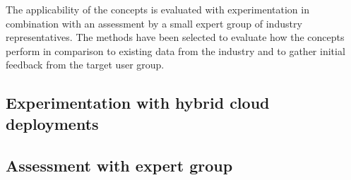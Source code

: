 \documentclass[../main.tex]{subfiles}
\begin{document}
    The applicability of the concepts is evaluated with experimentation in combination with an assessment by a small expert group of industry representatives.
    The methods have been selected to evaluate how the concepts perform in comparison to existing data from the industry and to gather initial feedback from the target user group.

    \subsection{Experimentation with hybrid cloud deployments}
    \label{subsec:meth-sim-depl}

    

    \subsection{Assessment with expert group}
    \label{subsec:meth-assessment}

    
\end{document}
